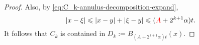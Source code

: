 \documentclass{amsart}
\theoremstyle{remark}
\renewcommand{\leq}{\leqslant}
\renewcommand{\leq}{\leqslant}
\newcommand{\e}{\mathrm{e}} %
\renewcommand{\leq}{\leqslant}%
\newcommand{\red}{\color{red}}
\begin{document}
\begin{proof}
%
  Also, by \eqref{eq:C_k-annulus-decomposition-expand},
  \begin{equation*}
    |x - \xi| \leq |x - y| + |\xi - y| \leq ({\red A} + 2^{k + 1}\alpha)t .
  \end{equation*}
 {\red It follows that $ C_k$ is contained in $D_k := B_{(A +2^{k + 1}\alpha)t}(x)$.}


\end{proof}
\end{document}
